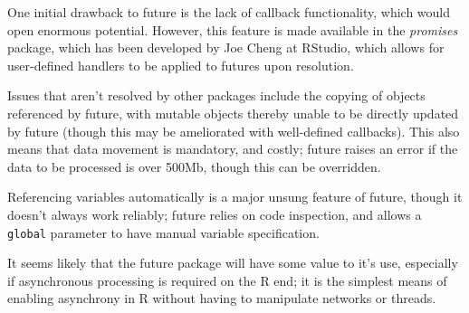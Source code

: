 \documentclass[10pt,a4paper]{article}
\begin{document}
One initial drawback to future is the lack of callback functionality, which
would open enormous potential. However, this feature is made available in the
\textit{promises} package, which has been developed by Joe Cheng at RStudio,
which allows for user-defined handlers to be applied to futures upon
resolution\cite{Cheng19}.

Issues that aren't resolved by other packages include the copying of objects
referenced by future, with mutable objects thereby unable to be directly
updated by future (though this may be ameliorated with well-defined callbacks).
This also means that data movement is mandatory, and costly; future raises an
error if the data to be processed is over 500Mb, though this can be overridden.

Referencing variables automatically is a major unsung feature of future, though
it doesn't always work reliably; future relies on code inspection, and allows a
\texttt{global} parameter to have manual variable specification.

It seems likely that the future package will have some value to it's use,
especially if asynchronous processing is required on the R end; it is the
simplest means of enabling asynchrony in R without having to manipulate
networks or threads.

\printbibliography{}
\end{document}

